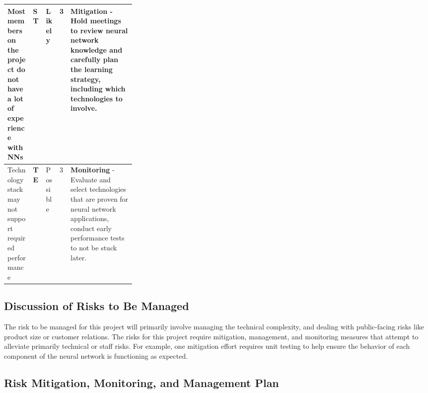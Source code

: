 \documentclass[english,12pt]{article}
\begin{document}
\begin{longtable}{|P{0.20\linewidth}|P{0.10\linewidth}|P{0.10cm}|P{0.5cm}|P{5.5cm}|}
  Most members on the project do not have a lot of experience with NNs & \textbf{ST} & Likely & 3 & 
  \small \textbf{Mitigation} - Hold meetings to review neural network knowledge and carefully plan the learning strategy, including which technologies to involve.\\
  \hline

  Technology stack may not support required performance & \textbf{TE} & Possible & 3 & 
  \small \textbf{Monitoring} - Evaluate and select technologies that are proven for neural network applications, conduct early performance tests to not be stuck later.\\
  \hline

\end{longtable}

\subsection{Discussion of Risks to Be Managed}
The risk to be managed for this project will primarily involve managing the technical complexity,
and dealing with public-facing risks like product size or customer relations. The risks for 
this project require mitigation, management, and monitoring
 measures that attempt to alleviate primarily technical or staff risks. For example,
one mitigation effort requires unit testing to help ensure the behavior of each component
of the neural network is functioning as expected.
\pagebreak
\subsection{Risk Mitigation, Monitoring, and Management Plan}
\end{document}
